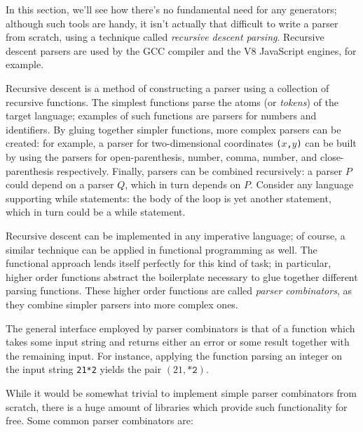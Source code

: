 \documentclass[11pt, american, draft]{PhdThesis}
\begin{document}
  In this section, we'll see how there's no fundamental need for any generators; although such tools
  are handy, it isn't actually that difficult to write a parser from scratch, using a technique
  called \emph{recursive descent parsing}. Recursive descent parsers are used by the GCC compiler
  and the V8 JavaScript engines, for example\cite{nystrom}.

  Recursive descent is a method of constructing a parser using a collection of recursive functions.
  The simplest functions parse the atoms (or \emph{tokens}) of the target language; examples of such
  functions are parsers for numbers and identifiers. By gluing together simpler functions, more
  complex parsers can be created: for example, a parser for two-dimensional coordinates
  \mbox{\texttt{($x$,$y$)}} can be built by using the parsers for open-parenthesis, number, comma,
  number, and close-parenthesis respectively. Finally, parsers can be combined recursively: a parser
  $P$ could depend on a parser $Q$, which in turn depends on $P$. Consider any language supporting
  while statements: the body of the loop is yet another statement, which in turn could be a while
  statement.

  Recursive descent can be implemented in any imperative language; of course, a similar technique
  can be applied in functional programming as well. The functional approach lends itself perfectly
  for this kind of task; in particular, higher order functions abstract the boilerplate necessary to
  glue together different parsing functions. These higher order functions are called \emph{parser
  combinators}, as they combine simpler parsers into more complex ones.

  The general interface employed by parser combinators is that of a function which takes some input
  string and returns either an error or some result together with the remaining input. For instance,
  applying the function parsing an integer on the input string \verb$21*2$ yields the pair
  \mbox{$\left(21, \texttt{*2}\right)$}.

  While it would be somewhat trivial to implement simple parser combinators from scratch, there is a
  huge amount of libraries which provide such functionality for free. Some common parser combinators
  are:
\end{document}
